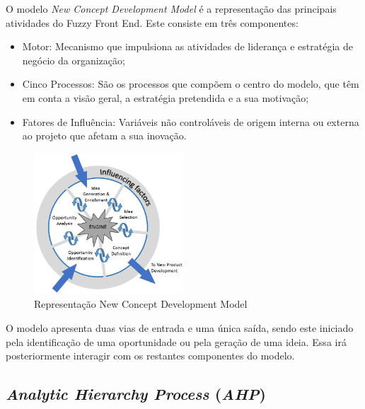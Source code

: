O modelo \emph{New Concept Development Model} é a representação das principais atividades do Fuzzy Front End. Este consiste em três componentes:

\begin{itemize}

\item Motor: Mecanismo que impulsiona as atividades de liderança e estratégia de negócio da organização;

\item Cinco Processos: São os processos que compõem o centro do modelo, que têm em conta a visão geral, a estratégia pretendida e a sua motivação;

\item Fatores de Influência: Variáveis não controláveis de origem interna ou externa ao projeto que afetam a sua inovação.

\end{itemize}

\begin{figure}[H]
    \begin{center}
    \includegraphics[width=0.5\textwidth]{figures/The-New-Concept-Development-NCD-model-Koen-et-al-2001.png}
    \caption{Representação New Concept Development Model}
    \end{center}
\end{figure}

O modelo apresenta duas vias de entrada e uma única saída, sendo este iniciado pela identificação de uma oportunidade ou pela geração de uma ideia. Essa irá posteriormente interagir com os restantes componentes do modelo.

\subsection{\emph{Analytic Hierarchy Process} (\emph{AHP})\label{section_AHP}\label{sym:AHP}}

